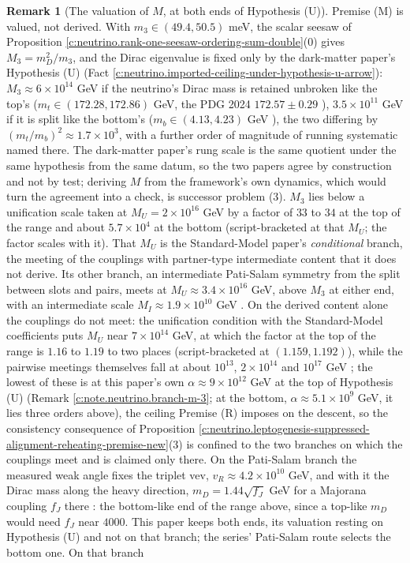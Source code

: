 \documentclass[11pt]{article}
\theoremstyle{definition}
\newtheorem{remark}[theorem]{Remark}
\theoremstyle{plain}
\begin{document}
\begin{remark}[The valuation of $M$, at both ends of Hypothesis (U)]\label{c:note.neutrino.valuation-m-both-ends-hypothesis-u}
Premise (M) is valued, not derived. With $m_{3} \in (49.4, 50.5)$ meV, the scalar seesaw of Proposition \ref{c:neutrino.rank-one-seesaw-ordering-sum-double}(0) gives $M_{3} = m_{D}^{2}/m_{3}$, and the Dirac eigenvalue is fixed only by the dark-matter paper's Hypothesis (U) (Fact \ref{c:neutrino.imported-ceiling-under-hypothesis-u-arrow}): $M_{3} \approx 6 \times 10^{14}$ GeV if the neutrino's Dirac mass is retained unbroken like the top's ($m_{t} \in (172.28, 172.86)$ GeV, the PDG 2024 $172.57 \pm 0.29$ \cite{PDG2024}), $3.5 \times 10^{11}$ GeV if it is split like the bottom's ($m_{b} \in (4.13, 4.23)$ GeV \cite{PDG2024}), the two differing by $(m_{t}/m_{b})^{2} \approx 1.7 \times 10^{3}$, with a further order of magnitude of running systematic named there. The dark-matter paper's rung scale is the same quotient under the same hypothesis from the same datum, so the two papers agree by construction and not by test; deriving $M$ from the framework's own dynamics, which would turn the agreement into a check, is successor problem (3). $M_{3}$ lies below a unification scale taken at $M_{U} = 2 \times 10^{16}$ GeV by a factor of $33$ to $34$ at the top of the range and about $5.7 \times 10^{4}$ at the bottom (script-bracketed at that $M_{U}$; the factor scales with it). That $M_{U}$ is the Standard-Model paper's \emph{conditional} branch, the meeting of the couplings with partner-type intermediate content that it does not derive. Its other branch, an intermediate Pati-Salam symmetry from the split between slots and pairs, meets at $M_{U} \approx 3.4 \times 10^{16}$ GeV, above $M_{3}$ at either end, with an intermediate scale $M_{I} \approx 1.9 \times 10^{10}$ GeV \cite[Prop.~10.10]{ButlerT12}. On the derived content alone the couplings do not meet: the unification condition with the Standard-Model coefficients puts $M_{U}$ near $7 \times 10^{14}$ GeV, at which the factor at the top of the range is $1.16$ to $1.19$ to two places (script-bracketed at $(1.159, 1.192)$), while the pairwise meetings themselves fall at about $10^{13}$, $2 \times 10^{14}$ and $10^{17}$ GeV \cite[Prop.~6.2]{ButlerT12}; the lowest of these is at this paper's own $\alpha \approx 9 \times 10^{12}$ GeV at the top of Hypothesis (U) (Remark \ref{c:note.neutrino.branch-m-3}; at the bottom, $\alpha \approx 5.1 \times 10^{9}$ GeV, it lies three orders above), the ceiling Premise (R) imposes on the descent, so the consistency consequence of Proposition \ref{c:neutrino.leptogenesis-suppressed-alignment-reheating-premise-new}(3) is confined to the two branches on which the couplings meet and is claimed only there. On the Pati-Salam branch the measured weak angle fixes the triplet vev, $v_{R} \approx 4.2 \times 10^{10}$ GeV, and with it the Dirac mass along the heavy direction, $m_{D} = 1.44\sqrt{f_{J}}$ GeV for a Majorana coupling $f_{J}$ there \cite[Prop.~11.2]{ButlerT12}: the bottom-like end of the range above, since a top-like $m_{D}$ would need $f_{J}$ near $4000$. This paper keeps both ends, its valuation resting on Hypothesis (U) and not on that branch; the series' Pati-Salam route selects the bottom one. On that branch 
\end{remark}
\end{document}
